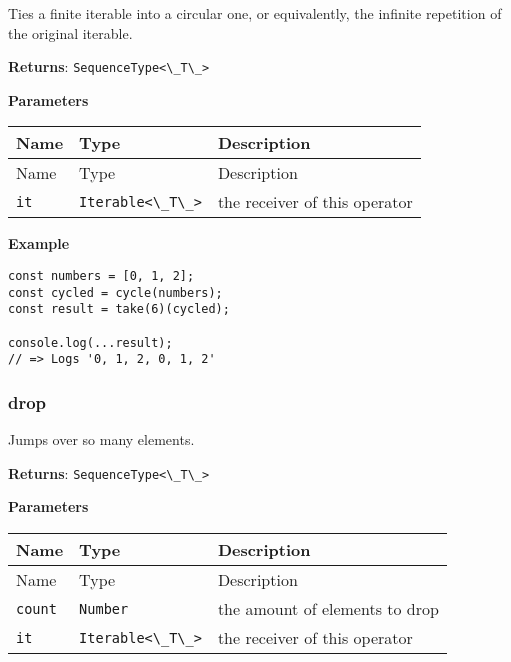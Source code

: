 Ties a finite iterable into a circular one, or equivalently, the
infinite repetition of the original iterable.

\textbf{Returns}: \passthrough{\lstinline!SequenceType<\_T\_>!}

\textbf{Parameters}

\begin{longtable}[]{
  >{\raggedright\arraybackslash}p{}
  >{\raggedright\arraybackslash}p{}
  >{\raggedright\arraybackslash}p{}@{}}

\toprule\noalign{}
Name & Type & Description \\
\midrule\noalign{}
\endfirsthead
\toprule\noalign{}
Name & Type & Description \\
\midrule\noalign{}
\endhead
\bottomrule\noalign{}
\endlastfoot
\passthrough{\lstinline!it!} & \passthrough{\lstinline!Iterable<\_T\_>!}
& the receiver of this operator \\
\end{longtable}

\textbf{Example}

\begin{lstlisting}[label=95f0febe-03e7-4da3-91b7-135c75ca4b96]
const numbers = [0, 1, 2];
const cycled = cycle(numbers);
const result = take(6)(cycled);
                               
console.log(...result);
// => Logs '0, 1, 2, 0, 1, 2'
\end{lstlisting}

\hypertarget{35daaeb3-b3ac-47ea-818b-89d3786249a2}{%
\subsubsection{drop}\label{35daaeb3-b3ac-47ea-818b-89d3786249a2}}

Jumps over so many elements.

\textbf{Returns}: \passthrough{\lstinline!SequenceType<\_T\_>!}

\textbf{Parameters}

\begin{longtable}[]{
  >{\raggedright\arraybackslash}p{}
  >{\raggedright\arraybackslash}p{}
  >{\raggedright\arraybackslash}p{}@{}}

\toprule\noalign{}
Name & Type & Description \\
\midrule\noalign{}
\endfirsthead
\toprule\noalign{}
Name & Type & Description \\
\midrule\noalign{}
\endhead
\bottomrule\noalign{}
\endlastfoot
\passthrough{\lstinline!count!} & \passthrough{\lstinline!Number!} & the
amount of elements to drop \\
\passthrough{\lstinline!it!} & \passthrough{\lstinline!Iterable<\_T\_>!}
& the receiver of this operator \\
\end{longtable}

